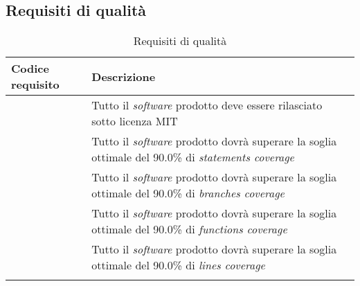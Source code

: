 \subsection{Requisiti di qualità}
\begin{longtabu}{|X[0.8,c]|X[3,c]|}

  \hline 

  \textbf{Codice requisito} & \textbf{Descrizione} \\ 

  \hline

   \label{rqua:mit} & Tutto il \textit{software} prodotto deve essere rilasciato sotto licenza MIT \\
  
  \hline

   \label{rqua:statements-coverage} & Tutto il \textit{software} prodotto dovrà superare la soglia ottimale del 90.0\% di \textit{statements coverage} \\
  
  \hline

   \label{rqua:branches-coverage} & Tutto il \textit{software} prodotto dovrà superare la soglia ottimale del 90.0\% di \textit{branches coverage} \\
  
  \hline

   \label{rqua:functions-coverage} & Tutto il \textit{software} prodotto dovrà superare la soglia ottimale del 90.0\% di \textit{functions coverage} \\
  
  \hline

   \label{rqua:lines-coverage} & Tutto il \textit{software} prodotto dovrà superare la soglia ottimale del 90.0\% di \textit{lines coverage} \\
  
  \hline

  \caption{Requisiti di qualità}
\end{longtabu}

